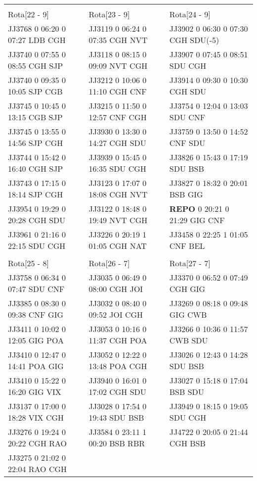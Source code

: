 \begin{scriptsize}
\begin{longtable}{l l l}
& & \\

Rota[22 - 9]  & Rota[23 - 9]  & Rota[24 - 9] \\
JJ3768 0 06:20 0 07:27 LDB CGH & JJ3119 0 06:24 0 07:35 CGH NVT & JJ3902 0 06:30 0 07:30 CGH SDU(-5)\\
JJ3740 0 07:55 0 08:55 CGH SJP & JJ3118 0 08:15 0 09:09 NVT CGH & JJ3907 0 07:45 0 08:51 SDU CGH\\
JJ3740 0 09:35 0 10:05 SJP CGB & JJ3212 0 10:06 0 11:10 CGH CNF & JJ3914 0 09:30 0 10:30 CGH SDU\\
JJ3745 0 10:45 0 13:15 CGB SJP & JJ3215 0 11:50 0 12:57 CNF CGH & JJ3754 0 12:04 0 13:03 SDU CNF\\
JJ3745 0 13:55 0 14:56 SJP CGH & JJ3930 0 13:30 0 14:27 CGH SDU & JJ3759 0 13:50 0 14:52 CNF SDU\\
JJ3744 0 15:42 0 16:40 CGH SJP & JJ3939 0 15:45 0 16:35 SDU CGH & JJ3826 0 15:43 0 17:19 SDU BSB\\
JJ3743 0 17:15 0 18:14 SJP CGH & JJ3123 0 17:07 0 18:08 CGH NVT & JJ3827 0 18:32 0 20:01 BSB GIG\\
JJ3954 0 19:29 0 20:28 CGH SDU & JJ3122 0 18:48 0 19:49 NVT CGH & \textbf{REPO}   0 20:21 0 21:29 GIG CNF\\
JJ3961 0 21:16 0 22:15 SDU CGH & JJ3226 0 20:19 1 01:05 CGH NAT & JJ3458 0 22:25 1 01:05 CNF BEL\\

& & \\

Rota[25 - 8]  & Rota[26 - 7]  & Rota[27 - 7] \\
JJ3758 0 06:34 0 07:47 SDU CNF & JJ3035 0 06:49 0 08:00 CGH JOI & JJ3370 0 06:52 0 07:49 CGH GIG\\
JJ3385 0 08:30 0 09:38 CNF GIG & JJ3032 0 08:40 0 09:52 JOI CGH & JJ3269 0 08:18 0 09:48 GIG CWB\\
JJ3411 0 10:02 0 12:05 GIG POA & JJ3053 0 10:16 0 11:37 CGH POA & JJ3266 0 10:36 0 11:57 CWB SDU\\
JJ3410 0 12:47 0 14:41 POA GIG & JJ3052 0 12:22 0 13:48 POA CGH & JJ3026 0 12:43 0 14:28 SDU BSB\\
JJ3410 0 15:22 0 16:20 GIG VIX & JJ3940 0 16:01 0 17:02 CGH SDU & JJ3027 0 15:18 0 17:04 BSB SDU\\
JJ3137 0 17:00 0 18:28 VIX CGH & JJ3028 0 17:54 0 19:43 SDU BSB & JJ3949 0 18:15 0 19:05 SDU CGH\\
JJ3276 0 19:24 0 20:22 CGH RAO & JJ3584 0 23:11 1 00:20 BSB RBR & JJ4722 0 20:05 0 21:44 CGH BSB\\
JJ3275 0 21:02 0 22:04 RAO CGH & & \\


\end{longtable}
\end{scriptsize}
